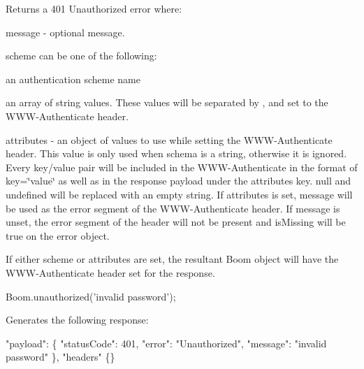 Returns a 401 Unauthorized error where\+:
\begin{DoxyItemize}
\item {\ttfamily message} -\/ optional message.
\item {\ttfamily scheme} can be one of the following\+:
\begin{DoxyItemize}
\item an authentication scheme name
\item an array of string values. These values will be separated by \textquotesingle{}, \textquotesingle{} and set to the \textquotesingle{}W\+W\+W-\/\+Authenticate\textquotesingle{} header.
\end{DoxyItemize}
\item {\ttfamily attributes} -\/ an object of values to use while setting the \textquotesingle{}W\+W\+W-\/\+Authenticate\textquotesingle{} header. This value is only used when {\ttfamily schema} is a string, otherwise it is ignored. Every key/value pair will be included in the \textquotesingle{}W\+W\+W-\/\+Authenticate\textquotesingle{} in the format of \textquotesingle{}key=\char`\"{}value\char`\"{}\textquotesingle{} as well as in the response payload under the {\ttfamily attributes} key. {\ttfamily null} and {\ttfamily undefined} will be replaced with an empty string. If {\ttfamily attributes} is set, {\ttfamily message} will be used as the \textquotesingle{}error\textquotesingle{} segment of the \textquotesingle{}W\+W\+W-\/\+Authenticate\textquotesingle{} header. If {\ttfamily message} is unset, the \textquotesingle{}error\textquotesingle{} segment of the header will not be present and {\ttfamily is\+Missing} will be true on the error object.
\end{DoxyItemize}

If either {\ttfamily scheme} or {\ttfamily attributes} are set, the resultant {\ttfamily Boom} object will have the \textquotesingle{}W\+W\+W-\/\+Authenticate\textquotesingle{} header set for the response.


\begin{DoxyCode}
Boom.unauthorized('invalid password');
\end{DoxyCode}


Generates the following response\+:


\begin{DoxyCode}
"payload": \{
    "statusCode": 401,
    "error": "Unauthorized",
    "message": "invalid password"
\},
"headers" \{\}
\end{DoxyCode}



